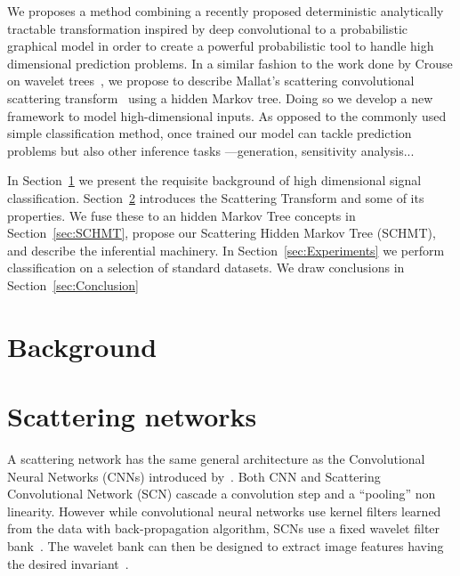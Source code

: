 \documentclass{article}
\begin{document}
	We proposes a method combining a recently proposed deterministic analytically tractable transformation inspired by deep convolutional to a probabilistic graphical model in order to create a powerful probabilistic tool to handle high dimensional prediction problems. In a similar fashion to the work done by Crouse on wavelet trees~\citep{crouse1998wavelet}, we propose to describe Mallat's scattering convolutional scattering transform~\citep{bruna2010classification} using a hidden Markov tree. Doing so we develop a new framework to model high-dimensional inputs. As opposed to the commonly used simple classification method, once trained our model can tackle prediction problems but also other inference tasks ---\eg generation, sensitivity analysis... %

	In  Section~\ref{sec:Background}  we  present  the  requisite  background  of high dimensional signal classification. Section~\ref{sec:SCN} introduces the Scattering Transform and some of its properties.   We  fuse these to an hidden Markov Tree concepts in Section~\ref{sec:SCHMT}, propose our Scattering Hidden Markov Tree (SCHMT), and describe the inferential machinery. In Section~\ref{sec:Experiments} we perform classification on a selection of standard datasets. We draw conclusions in Section~\ref{sec:Conclusion}
	
\section{Background}
	\label{sec:Background}

	


\section{Scattering networks}
\label{sec:SCN}
	
	A scattering network has the same general architecture as the Convolutional Neural Networks (CNNs) introduced by~\citet{lecun1995convolutional}. Both CNN and Scattering Convolutional Network (SCN) cascade a convolution step and a ``pooling'' non linearity. However while convolutional neural networks use kernel filters learned from the data with back-propagation algorithm, SCNs use a fixed wavelet filter bank~\cite{mallat}. The wavelet bank can then be designed to extract image features having the desired invariant~\cite{work translation invariant, work rotation invariant, work rigid motion}. 
	
\end{document}
